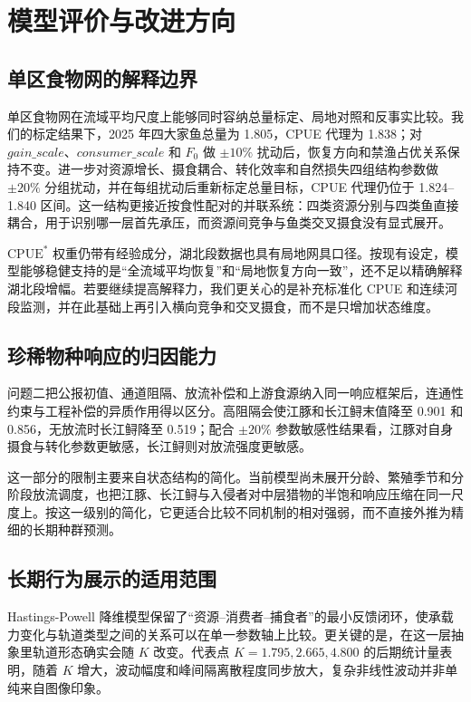 \documentclass{MMCStyle}
\begin{document}
\section{模型评价与改进方向}

\subsection{单区食物网的解释边界}
单区食物网在流域平均尺度上能够同时容纳总量标定、局地对照和反事实比较。我们的标定结果下，2025 年四大家鱼总量为 1.805，CPUE 代理为 1.838；对 $gain\_scale$、$consumer\_scale$ 和 $F_0$ 做 $\pm10\%$ 扰动后，恢复方向和禁渔占优关系保持不变。进一步对资源增长、摄食耦合、转化效率和自然损失四组结构参数做 $\pm20\%$ 分组扰动，并在每组扰动后重新标定总量目标，CPUE 代理仍位于 1.824--1.840 区间。这一结构更接近按食性配对的并联系统：四类资源分别与四类鱼直接耦合，用于识别哪一层首先承压，而资源间竞争与鱼类交叉摄食没有显式展开。

$\mathrm{CPUE}^*$ 权重仍带有经验成分，湖北段数据也具有局地网具口径。按现有设定，模型能够稳健支持的是“全流域平均恢复”和“局地恢复方向一致”，还不足以精确解释湖北段增幅。若要继续提高解释力，我们更关心的是补充标准化 CPUE 和连续河段监测，并在此基础上再引入横向竞争和交叉摄食，而不是只增加状态维度。

\subsection{珍稀物种响应的归因能力}
问题二把公报初值、通道阻隔、放流补偿和上游食源纳入同一响应框架后，连通性约束与工程补偿的异质作用得以区分。高阻隔会使江豚和长江鲟末值降至 0.901 和 0.856，无放流时长江鲟降至 0.519；配合 $\pm 20\%$ 参数敏感性结果看，江豚对自身摄食与转化参数更敏感，长江鲟则对放流强度更敏感。

这一部分的限制主要来自状态结构的简化。当前模型尚未展开分龄、繁殖季节和分阶段放流调度，也把江豚、长江鲟与入侵者对中层猎物的半饱和响应压缩在同一尺度上。按这一级别的简化，它更适合比较不同机制的相对强弱，而不直接外推为精细的长期种群预测。

\subsection{长期行为展示的适用范围}
Hastings-Powell 降维模型保留了“资源--消费者--捕食者”的最小反馈闭环，使承载力变化与轨道类型之间的关系可以在单一参数轴上比较。更关键的是，在这一层抽象里轨道形态确实会随 $K$ 改变。代表点 $K=1.795,2.665,4.800$ 的后期统计量表明，随着 $K$ 增大，波动幅度和峰间隔离散程度同步放大，复杂非线性波动并非单纯来自图像印象。
\end{document}
